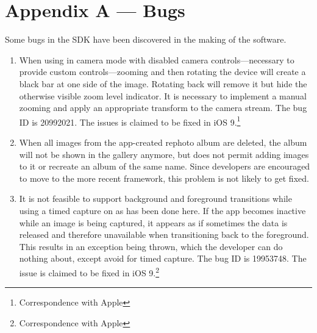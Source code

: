 \chapter{Appendix A --- Bugs}

Some bugs in the SDK have been discovered in the making of the software.
\begin{enumerate}

   \item When using  in camera mode with disabled
      camera controls---necessary to provide custom controls---zooming and then
      rotating the device will create a black bar at one side of the image.
      Rotating back will remove it but hide the otherwise visible zoom level
      indicator. It is necessary to implement a manual zooming and apply an
      appropriate transform to the camera stream. The bug ID is 20992021. The
      issues is claimed to be fixed in iOS 9.\footnote{Correspondence with Apple}

   \item When all images from the app-created rephoto album are deleted, the
      album will not be shown in the gallery anymore, but 
      does not permit adding images to it or recreate an album of the same name.
      Since developers are encouraged to move to the more recent 
      framework, this problem is not likely to get fixed. 

   \item It is not feasible to support background and foreground transitions
      while using a timed capture on  as has been
      done here. If the app becomes inactive while an image is being captured,
      it appears as if sometimes the data is released and therefore unavailable when
      transitioning back to the foreground. This results in an exception being
      thrown, which the developer can do nothing about, except avoid
       for timed capture. The bug ID is 19953748.
      The issue is claimed to be fixed in iOS 9.\footnote{Correspondence with Apple}
\end{enumerate}
